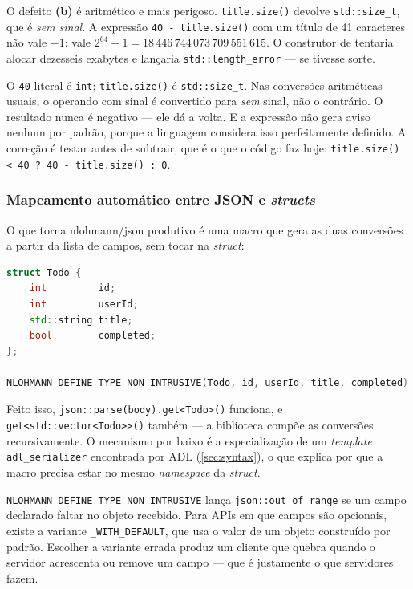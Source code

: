 O defeito \textbf{(b)} é aritmético e mais perigoso. \texttt{title.size()}
devolve \texttt{std::size\_t}, que é \emph{sem sinal}. A expressão
\texttt{40 - title.size()} com um título de 41 caracteres não vale $-1$: vale
$2^{64}-1 = 18\,446\,744\,073\,709\,551\,615$. O construtor de
 tentaria alocar dezesseis exabytes e lançaria
\texttt{std::length\_error} --- se tivesse sorte.

\begin{armadilha}
O \texttt{40} literal é \texttt{int}; \texttt{title.size()} é
\texttt{std::size\_t}. Nas conversões aritméticas usuais, o operando com sinal
é convertido para \emph{sem} sinal, não o contrário. O resultado nunca é
negativo --- ele dá a volta. E a expressão não gera aviso nenhum por padrão,
porque a linguagem considera isso perfeitamente definido. A correção é testar
antes de subtrair, que é o que o código faz hoje:
\texttt{title.size() < 40 ? 40 - title.size() : 0}.
\end{armadilha}

\subsubsection{Mapeamento automático entre JSON e \emph{structs}}

O que torna nlohmann/json produtivo é uma macro que gera as duas conversões a
partir da lista de campos, sem tocar na \emph{struct}:

\begin{lstlisting}[style=bt, language=C++,
    caption={\texttt{src/http-client/main.cpp}: uma linha substitui duas
             funções escritas à mão.}]
struct Todo {
    int         id;
    int         userId;
    std::string title;
    bool        completed;
};

NLOHMANN_DEFINE_TYPE_NON_INTRUSIVE(Todo, id, userId, title, completed)
\end{lstlisting}

Feito isso, \texttt{json::parse(body).get<Todo>()} funciona, e
\texttt{get<std::vector<Todo>>()} também --- a biblioteca compõe as conversões
recursivamente. O mecanismo por baixo é a especialização de um \emph{template}
\texttt{adl\_serializer} encontrada por ADL (\cref{sec:syntax}), o que explica
por que a macro precisa estar no mesmo \emph{namespace} da \emph{struct}.

\begin{armadilha}
\texttt{NLOHMANN\_DEFINE\_TYPE\_NON\_INTRUSIVE} lança
\texttt{json::out\_of\_range} se um campo declarado faltar no objeto recebido.
Para APIs em que campos são opcionais, existe a variante
\texttt{\_WITH\_DEFAULT}, que usa o valor de um objeto construído por padrão.
Escolher a variante errada produz um cliente que quebra quando o servidor
acrescenta ou remove um campo --- que é justamente o que servidores fazem.
\end{armadilha}

